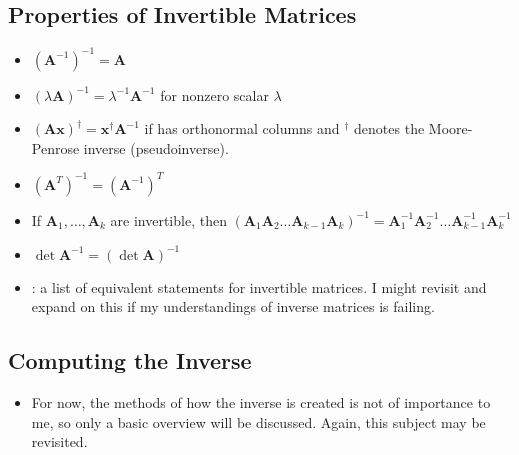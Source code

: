 \begin{itemize}
  \subsection{Properties of Invertible Matrices}\label{Properties of Invertible Matrices}
  \begin{itemize}
    \item \((\bm{A}^{-1} )^{-1} = \bm{A}\)
    \item \((\lambda \bm{A} )^{-1} = \lambda ^{-1} \bm{A} ^{-1} \) for nonzero scalar \(\lambda \)
    \item \((\bm{Ax})^{\dagger} = \bm{x}^{\dagger} \bm{A}^{-1}\) if  has orthonormal columns and \(^\dagger \) denotes the Moore-Penrose inverse (pseudoinverse).
    \item \((\bm{A}^T)^{-1} = (\bm{A}^{-1})^T \)
    \item If \(\bm{A}_1,\ldots,\bm{A}_k \) are invertible, then \((\bm{A}_1\bm{A}_2\ldots \bm{A}_{k-1}\bm{A}_k)^{-1} = \bm{A}_1 ^{-1}\bm{A}_2 ^{-1}\ldots \bm{A}_{k-1}^{-1}\bm{A}_k ^{-1}\) 
    \item \(\det{\bm{A} ^{-1}} = (\det{\bm{A}}) ^{-1}\)
    \item {}: a list of equivalent statements for invertible matrices. I might revisit and expand on this if my understandings of inverse matrices is failing. 
  \end{itemize}

  \subsection{Computing the Inverse}\label{Computing the Inverse}
  \begin{itemize}
    \item For now, the methods of how the inverse is created is not of importance to me, so only a basic overview will be discussed. Again, this subject may be revisited.
  \end{itemize}
  
\end{itemize}